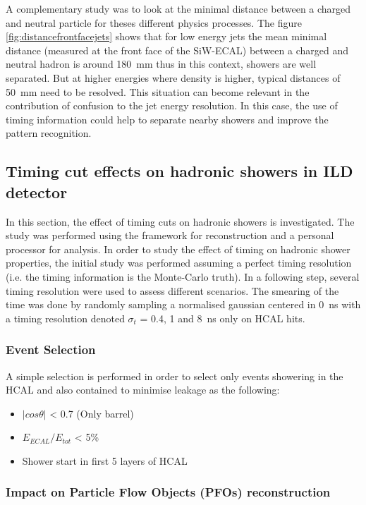 A complementary study was to look at the minimal distance between a charged and neutral particle for theses different physics processes. The figure \ref{fig:distancefrontfacejets} shows that for low energy jets the mean minimal distance (measured at the front face of the SiW-ECAL) between a charged and neutral hadron is around \SI{180}{\milli\meter} thus in this context, showers are well separated. But at higher energies where density is higher, typical distances of \SI{50}{\milli\meter} need to be resolved. This situation can become relevant in the contribution of confusion to the jet energy resolution. In this case, the use of timing information could help to separate nearby showers and improve the pattern recognition.

\subsection{Timing cut effects on hadronic showers in ILD detector}

In this section, the effect of timing cuts on hadronic showers is investigated. The study was performed using the \ilcsoft framework for reconstruction and a personal \marlin processor for analysis. In order to study the effect of timing on hadronic shower properties, the initial study was performed assuming a perfect timing resolution (i.e. the timing information is the Monte-Carlo truth). In a following step, several timing resolution were used to assess different scenarios. The smearing of the time was done by randomly sampling a normalised gaussian centered in \SI{0}{\nano\second} with a timing resolution denoted $\sigma_{t}$ = 0.4, 1 and \SI{8}{\nano\second} only on HCAL hits.

\subsubsection{Event Selection}

A simple selection is performed in order to select only events showering in the HCAL and also contained to minimise leakage as the following:
\begin{itemize}
  \item $|cos\theta|$ < 0.7 (Only barrel)
  \item $E_{ECAL}/E_{tot}$ < 5\%
  \item Shower start in first 5 layers of HCAL
\end{itemize}

\subsubsection{Impact on Particle Flow Objects (PFOs) reconstruction}

